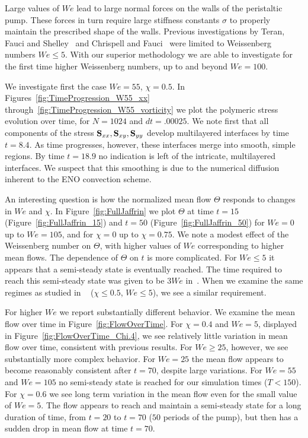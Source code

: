 Large values of $We$ lead to large normal forces on the walls of the peristaltic pump. These forces in turn require large stiffness constants $\sigma$ to properly maintain the prescribed shape of the walls. Previous investigations by Teran, Fauci and Shelley~\cite{teran2008peristaltic} and Chrispell and Fauci~\cite{chrispell2010peristaltic} were limited to Weissenberg numbers $We\leq 5$. With our superior methodology we are able to investigate for the first time higher Weissenberg numbers, up to and beyond $We=100$.

We investigate first the case $We=55$, $\chi=0.5$.
In Figures~\ref{fig:TimeProgression_W55_xx} through~\ref{fig:TimeProgression_W55_vorticity} we plot the polymeric stress evolution over time, for $N=1024$ and $dt=.00025$. We note first that all components of the stress $\mathbf{S}_{xx}, \mathbf{S}_{xy}, \mathbf{S}_{yy}$ develop multilayered interfaces by time $t=8.4$. As time progresses, however, these interfaces merge into smooth, simple regions. By time $t=18.9$ no indication is left of the intricate, multilayered interfaces. We suspect that this smoothing is due to the numerical diffusion inherent to the ENO convection scheme.

An interesting question is how the normalized mean flow $\Theta$ responds to changes in $We$ and $\chi$. In Figure~\ref{fig:FullJaffrin} we plot $\Theta$ at time $t=15$ (Figure~\ref{fig:FullJaffrin_15}) and $t=50$ (Figure~\ref{fig:FullJaffrin_50}) for $We=0$ up to $We=105$, and for $\chi=0$ up to $\chi=0.75$. We note a modest effect of the Weissenberg number on $\Theta$, with higher values of $We$ corresponding to higher mean flows. The dependence of $\Theta$ on $t$ is more complicated. For $We\leq 5$ it appears that a semi-steady state is eventually reached. The time required to reach this semi-steady state was given to be $3We$ in~\cite{teran2008peristaltic, chrispell2010peristaltic}. When we examine the same regimes as studied in ~\cite{teran2008peristaltic, chrispell2010peristaltic} ($\chi\leq 0.5$, $We\leq 5$), we see a similar requirement.

For higher $We$ we report substantially different behavior. We examine the mean flow over time in Figure~\ref{fig:FlowOverTime}. For $\chi=0.4$ and $We=5$, displayed in Figure~\ref{fig:FlowOverTime_Chi.4}, we see relatively little variation in mean flow over time, consistent with previous results. For $We\geq 25$, however, we see substantially more complex behavior. For $We=25$ the mean flow appears to become reasonably consistent after $t=70$, despite large variations. For $We=55$ and $We=105$ no semi-steady state is reached for our simulation times ($T<150$). For $\chi=0.6$ we see long term variation in the mean flow even for the small value of $We=5$. The flow appears to reach and maintain a semi-steady state for a long duration of time, from $t=20$ to $t=70$ ($50$ periods of the pump), but then has a sudden drop in mean flow at time $t=70$.


